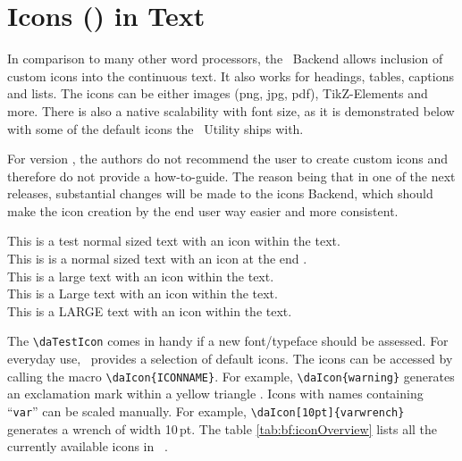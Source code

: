\section{Icons (\daTestIcon) in Text}
	In comparison to many other word processors, the \productName~Backend allows inclusion of custom icons into the continuous text. It also works for headings, tables, captions and lists. The icons can be either images (png, jpg, pdf), TikZ-Elements and more. There is also a native scalability with font size, as it is demonstrated below with some of the default icons the \productName~Utility ships with. %
	\begin{daInfoBox}
		For version \productVersion, the authors do not recommend the user to create custom icons and therefore do not provide a how-to-guide.
		The reason being that in one of the next releases, substantial changes will be made to the icons Backend, which should make the icon creation by the
		end user way easier and more consistent.
	\end{daInfoBox}
	This is a test normal sized text with an \daTestIcon icon within the text.\\[0.125cm]
	This is is a normal sized text with an icon at the end \daTestIcon.\\[0.125cm]
	{\large This is a large text with an \daTestIcon icon within the text.}\\[0.125cm]
	{\Large This is a Large text with an \daTestIcon icon within the text.}\\[0.125cm]
	{\LARGE This is a LARGE text with an \daTestIcon icon within the text.}\\[0.125cm]
	
	\lstset{style=LaTeX}
	
	The \lstinline$\daTestIcon$ comes in handy if a new font/typeface should be assessed.
	\newline For everyday use,
	\productName~provides a selection of default icons. The icons can be accessed by calling the macro \lstinline[emphstyle={\color{orange}\bfseries},moreemph={icon}]$\daIcon{ICONNAME}$. For example,
	\lstinline[emphstyle={\color{orange}\bfseries},moreemph={icon}]$\daIcon{warning}$ 
	generates an exclamation mark within a yellow triangle . Icons with names containing \enquote{\lstinline$var$} can be scaled manually. For example,  \lstinline[emphstyle={\color{orange}\bfseries},moreemph={icon}]$\daIcon[10pt]{varwrench}$ generates a wrench  of width \mbox{10\,pt}. The table \ref{tab:bf:iconOverview} lists all the currently available icons in \mbox{\productName}~\mbox{\productVersion}.
	

